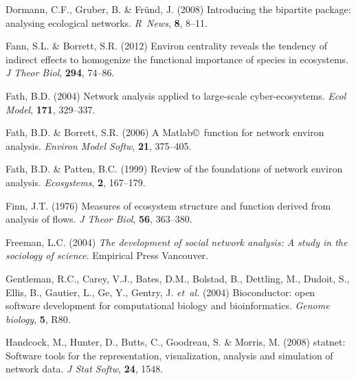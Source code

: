 \documentclass[11pt]{article}
\newcommand{\R}{R}
\begin{document}
\begin{thebibliography}{75}
Dormann, C.F., Gruber, B. \& Fr{\"u}nd, J. (2008) Introducing the bipartite
  package: analysing ecological networks.
\newblock \emph{\R\ News}, \textbf{8}, 8--11.

Fann, S.L. \& Borrett, S.R. (2012) Environ centrality reveals the tendency of
  indirect effects to homogenize the functional importance of species in
  ecosystems.
\newblock \emph{J Theor Biol}, \textbf{294}, 74--86.

Fath, B.D. (2004) Network analysis applied to large-scale cyber-ecosystems.
\newblock \emph{Ecol Model}, \textbf{171}, 329--337.

Fath, B.D. \& Borrett, S.R. (2006) A {Matlab}\copyright\ function for network
  environ analysis.
\newblock \emph{Environ Model Softw}, \textbf{21}, 375--405.

Fath, B.D. \& Patten, B.C. (1999) Review of the foundations of network environ
  analysis.
\newblock \emph{Ecosystems}, \textbf{2}, 167--179.

Finn, J.T. (1976) Measures of ecosystem structure and function derived from
  analysis of flows.
\newblock \emph{J Theor Biol}, \textbf{56}, 363--380.

Freeman, L.C. (2004) \emph{The development of social network analysis: A study
  in the sociology of science}.
\newblock Empirical Press Vancouver.

Gentleman, R.C., Carey, V.J., Bates, D.M., Bolstad, B., Dettling, M., Dudoit,
  S., Ellis, B., Gautier, L., Ge, Y., Gentry, J. \emph{et~al.} (2004)
  Bioconductor: open software development for computational biology and
  bioinformatics.
\newblock \emph{Genome biology}, \textbf{5}, R80.

Handcock, M., Hunter, D., Butts, C., Goodreau, S. \& Morris, M. (2008) statnet:
  Software tools for the representation, visualization, analysis and simulation
  of network data.
\newblock \emph{J Stat Softw}, \textbf{24}, 1548.


\end{thebibliography}
\end{document}
